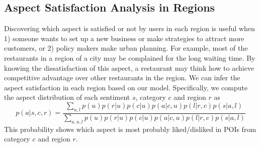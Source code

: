 \subsection{Aspect Satisfaction Analysis in Regions}
\label{sec:asr}
Discovering which aspect is satisfied or not by
users in each region is useful when 1) someone wants to
set up a new business or make strategies to attract more customers,
or 2) policy makers make urban planning.
For example, most of the restaurants in a region
of a city may be complained for the
long waiting time. By knowing the dissatisfaction of this aspect,
a restaurant may think how to achieve competitive
advantage over other restaurants in the region.
We can infer the aspect satisfaction
in each region based on our model. Specifically, we compute the
aspect distribution of each sentiment $s$, category $c$ and
region $r$ as
\begin{equation}
p(a|s,c,r)=\frac{\sum_{u,l}{p(u)p(r|u)p(c|u)p(a|c,u)p(l|r,c)p(s|a,l)}}{
\sum_{a,u,l}{p(u)p(r|u)p(c|u)p(a|c,u)p(l|r,c)p(s|a,l)}}
\label{eq:sat}
\end{equation}
This probability shows which aspect is most probably liked/disliked
in POIs from category $c$ and region $r$.


